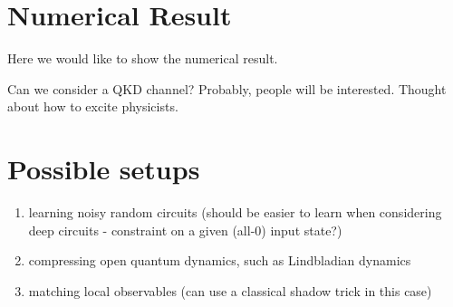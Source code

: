 \documentclass[%
 reprint,
 amsmath,amssymb,
 aps,
]{revtex4-2}
\begin{document}
\section{Numerical Result}
Here we would like to show the numerical result.

Can we consider a QKD channel? Probably, people will be interested. Thought about how to excite physicists.


\section{Possible setups}
\begin{enumerate}
    \item learning noisy random circuits (should be easier to learn when considering deep circuits - constraint on a given (all-0) input state?)
    \item compressing open quantum dynamics, such as Lindbladian dynamics
    \item matching local observables (can use a classical shadow trick in this case)
\end{enumerate}


\end{document}
